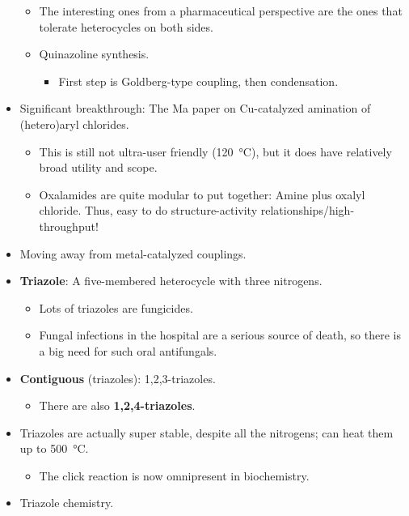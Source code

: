 \documentclass[../notes.tex]{subfiles}
\begin{document}
\begin{itemize}
\begin{itemize}
\begin{itemize}
        \end{itemize}
        \item The interesting ones from a pharmaceutical perspective are the ones that tolerate heterocycles on both sides.
        \item Quinazoline synthesis.
        \begin{itemize}
            \item First step is Goldberg-type coupling, then condensation.
        \end{itemize}
    \end{itemize}
    \item Significant breakthrough: The Ma paper on Cu-catalyzed amination of (hetero)aryl chlorides.
    \begin{itemize}
        \item This is still not ultra-user friendly (\SI{120}{\celsius}), but it does have relatively broad utility and scope.
        \item Oxalamides are quite modular to put together: Amine plus oxalyl chloride. Thus, easy to do structure-activity relationships/high-throughput!
    \end{itemize}
    \item Moving away from metal-catalyzed couplings.
    \item \textbf{Triazole}: A five-membered heterocycle with three nitrogens.
    \begin{itemize}
        \item Lots of triazoles are fungicides.
        \item Fungal infections in the hospital are a serious source of death, so there is a big need for such oral antifungals.
    \end{itemize}
    \item \textbf{Contiguous} (triazoles): 1,2,3-triazoles.
    \begin{itemize}
        \item There are also \textbf{1,2,4-triazoles}.
    \end{itemize}
    \item Triazoles are actually super stable, despite all the nitrogens; can heat them up to \SI{500}{\celsius}.
    \begin{itemize}
        \item The click reaction is now omnipresent in biochemistry.
    \end{itemize}
    \item Triazole chemistry.
    \begin{itemize}

\end{itemize}
\end{itemize}
\end{document}

